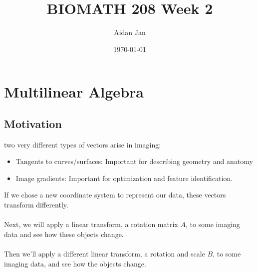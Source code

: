 \documentclass[10pt]{article}
\title{BIOMATH 208 Week 2}
\author{Aidan Jan}
\date{\today}
\begin{document}
\maketitle
\section*{Multilinear Algebra}
\subsection*{Motivation}
two very different types of vectors arise in imaging:
\begin{itemize}
    \item Tangents to curves/surfaces: Important for describing geometry and anatomy
    \item Image gradients: Important for optimization and feature identification.
\end{itemize}
If we chose a new coordinate system to represent our data, these vectors transform differently.\\\\
Next, we will apply a linear transform, a rotation matrix $A$, to some imaging data and see how these objects change.\\\\
Then we'll apply a different linear transform, a rotation and scale $B$, to some imaging data, and see how the objects change.
\end{document}
